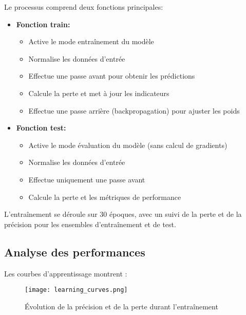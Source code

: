 \documentclass{article}
\begin{document}
Le processus comprend deux fonctions principales:
\begin{itemize}
    \item \textbf{Fonction train:}
    \begin{itemize}
        \item Active le mode entraînement du modèle
        \item Normalise les données d'entrée
        \item Effectue une passe avant pour obtenir les prédictions
        \item Calcule la perte et met à jour les indicateurs
        \item Effectue une passe arrière (backpropagation) pour ajuster les poids
    \end{itemize}
    
    \item \textbf{Fonction test:}
    \begin{itemize}
        \item Active le mode évaluation du modèle (sans calcul de gradients)
        \item Normalise les données d'entrée
        \item Effectue uniquement une passe avant
        \item Calcule la perte et les métriques de performance
    \end{itemize}
\end{itemize}

L'entraînement se déroule sur 30 époques, avec un suivi de la perte et de la précision pour les ensembles d'entraînement et de test.
\newpage
\subsection{Analyse des performances}
\label{subsec:performances}

Les courbes d'apprentissage montrent :

\begin{figure}[H]
    \centering
    \texttt{[image: learning\_curves.png]}
    \caption{Évolution de la précision et de la perte durant l'entraînement}
    \label{fig:curves}
\end{figure}
\end{document}
